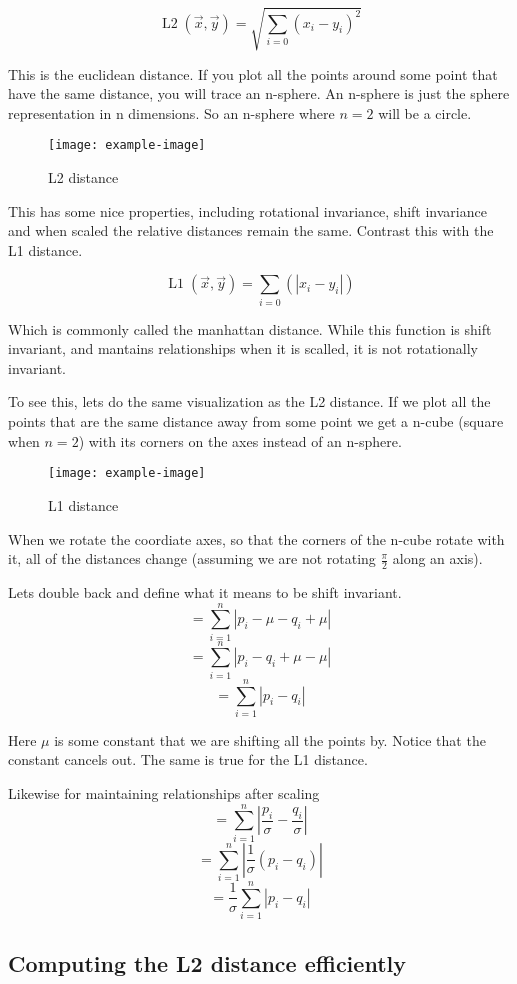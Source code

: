 $$\operatorname{L2}(\vec{x}, \vec{y}) = \sqrt{\sum_{i=0} (x_i - y_i)^2}$$

This is the euclidean distance. If you plot all the points around some point that have the same distance,
you will trace an n-sphere. An n-sphere is just the sphere representation in n dimensions. So an n-sphere
where $n=2$ will be a circle. 

\begin{figure}[h]
\caption{L2 distance}
\centering
\texttt{[image: example-image]}
\end{figure}


This has some nice properties, including rotational invariance, 
shift invariance and when scaled the relative distances remain the same. Contrast this with the L1 distance.

$$\operatorname{L1}(\vec{x}, \vec{y}) = \sum_{i=0} (|x_i - y_i|)$$

Which is commonly called the manhattan distance. While this function is shift invariant, and mantains
relationships when it is scalled, it is not rotationally invariant. 

To see this, lets do the same visualization as the L2 distance. If we plot all the points that are the same
distance away from some point we get a n-cube (square when $n=2$) with its corners on the axes instead of an
n-sphere. 

\begin{figure}[h]
\caption{L1 distance}
\centering
\texttt{[image: example-image]}
\end{figure}

When we rotate the coordiate axes, so that the corners of the n-cube rotate with it, all of the distances
change (assuming we are not rotating $\frac{\pi}{2}$ along an axis). 

Lets double back and define what it means to be shift invariant. 
$$= \sum _{i=1}^{n}|p_{i}-\mu-q_{i}+\mu|$$
$$= \sum _{i=1}^{n}|p_{i}-q_{i}+\mu-\mu|$$
$$= \sum _{i=1}^{n}|p_{i}-q_{i}|$$

Here $\mu$ is some constant that we are shifting all the points by. Notice that the constant
cancels out. The same is true for the L1 distance. 

Likewise for maintaining relationships after scaling
$$= \sum _{i=1}^{n}|\frac{p_{i}}{\sigma}-\frac{q_{i}}{\sigma}|$$
$$= \sum _{i=1}^{n}|\frac{1}{\sigma}(p_{i}-q_{i})|$$
$$= \frac{1}{\sigma}\sum _{i=1}^{n}|p_{i}-q_{i}|$$

\subsection{Computing the L2 distance efficiently}
